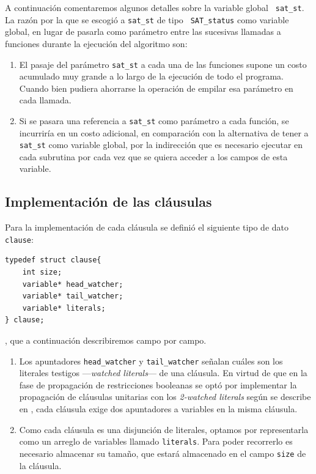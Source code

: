 \documentclass[12pt,lettersize,oneside]{article}
\begin{document}
A continuación comentaremos algunos detalles sobre la variable global {\tt
  sat\_st}. La razón por la que se escogió a {\tt sat\_st} de tipo {\tt
  SAT\_status} como variable global, en lugar de pasarla como parámetro entre
las sucesivas llamadas a funciones durante la ejecución del algoritmo son:
\begin{enumerate}
\item El pasaje del parámetro {\tt sat\_st} a cada una de las funciones supone
  un costo acumulado muy grande a lo largo de la ejecución de todo el
  programa. Cuando bien pudiera ahorrarse la operación de empilar esa parámetro
  en cada llamada.
\item Si se pasara una referencia a {\tt sat\_st} como parámetro a cada función,
  se incurriría en un costo adicional, en comparación con la alternativa de
  tener a {\tt sat\_st} como variable global, por la indirección que es
  necesario ejecutar en cada subrutina por cada vez que se quiera acceder a los
  campos de esta variable.
\end{enumerate}

\subsection{Implementación de las cláusulas}\label{clausulas}

Para la implementación de cada cláusula se definió el siguiente tipo de dato
{\tt clause}:
\begin{lstlisting}
typedef struct clause{
    int size;
    variable* head_watcher;
    variable* tail_watcher;
    variable* literals;
} clause;
\end{lstlisting}
, que a continuación describiremos campo por campo.\vspace{-2.5mm}
\begin{enumerate}
\item Los apuntadores {\tt head\_watcher} y {\tt tail\_watcher} señalan cuáles
  son los literales testigos ---\emph{watched literals}--- de una cláusula. En
  virtud de que en la fase de propagación de restricciones booleanas se optó por
  implementar la propagación de cláusulas unitarias con los \emph{2-watched
    literals} según se describe en \cite{Zhang},
  cada cláusula exige dos apuntadores a variables en la misma cláusula.

\item Como cada cláusula es una disjunción de literales, optamos por
  representarla como un arreglo de variables llamado {\tt literals}. Para poder
  recorrerlo es necesario almacenar su tamaño, que estará almacenado en el campo
  {\tt size} de la cláusula.
\end{enumerate}
\end{document}
